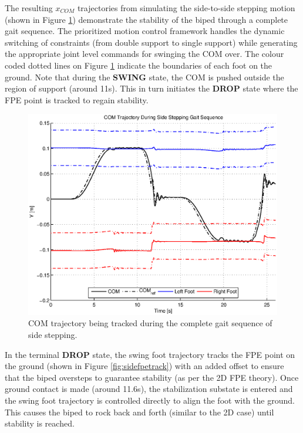 The resulting $x_{COM}$ trajectories from simulating the side-to-side stepping motion (shown in Figure \ref{fig:sidecomtraj}) demonstrate the stability of the biped through a complete gait sequence. The prioritized motion control framework handles the dynamic switching of constraints (from double support to single support) while generating the appropriate joint level commands for swinging the COM over. The colour coded dotted lines on Figure \ref{fig:sidecomtraj} indicate the boundaries of each foot on the ground. Note that during the \textbf{SWING} state, the COM is pushed outside the region of support (around 11s). This in turn initiates the \textbf{DROP} state where the FPE point is tracked to regain stability.

\begin{figure}[!h]
	\centering
    \includegraphics[scale=0.6]{fig/simulations/sidecomtraj.eps}
  	\caption{COM trajectory being tracked during the complete gait sequence of side stepping.}
	\label{fig:sidecomtraj}
\end{figure}


In the terminal \textbf{DROP} state, the swing foot trajectory tracks the FPE point on the ground (shown in Figure \ref{fig:sidefpetrack}) with an added offset to ensure that the biped oversteps to guarantee stability (as per the 2D FPE theory). Once ground contact is made (around 11.6s), the stabilization substate is entered and the swing foot trajectory is controlled directly to align the foot with the ground. This causes the biped to rock back and forth (similar to the 2D case) until stability is reached.

